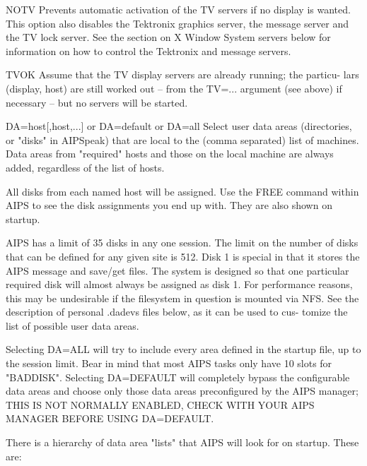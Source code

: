        NOTV    Prevents automatic activation of the  TV  servers  if  no  display  is
               wanted.   This option also disables the Tektronix graphics server, the
               message server and the TV lock server.  See the section  on  X  Window
               System  servers  below for information on how to control the Tektronix
               and message servers.

       TVOK    Assume that the TV display servers are already running;  the  particu-
               lars  (display, host) are still worked out -- from the TV=... argument
               (see above) if necessary -- but no servers will be started.

       DA=host[,host,...] or DA=default or DA=all
               Select user data areas (directories, or "disks" in AIPSpeak) that  are
               local  to  the  (comma  separated)  list of machines.  Data areas from
               "required" hosts and those on the  local  machine  are  always  added,
               regardless of the list of hosts.

               All disks from each named host will be assigned.  Use the FREE command
               within AIPS to see the disk assignments you end  up  with.   They  are
               also shown on startup.

               AIPS  has  a  limit  of 35 disks in any one session.  The limit on the
               number of disks that can be defined for any given site is 512.  Disk 1
               is special in that it stores the AIPS message and save/get files.  The
               system is designed so that one particular required  disk  will  almost
               always  be  assigned  as disk 1.  For performance reasons, this may be
               undesirable if the filesystem in question is mounted via NFS.  See the
               description of personal .dadevs files below, as it can be used to cus-
               tomize the list of possible user data areas.

               Selecting DA=ALL will try to include every area defined in the startup
               file, up to the session limit.  Bear in mind that most AIPS tasks only
               have 10 slots for  "BADDISK".   Selecting  DA=DEFAULT  will completely
               bypass the configurable data areas  and  choose only  those data areas
               preconfigured by the AIPS manager; THIS IS NOT NORMALLY ENABLED, CHECK
               WITH YOUR AIPS MANAGER BEFORE USING DA=DEFAULT.

               There  is  a hierarchy of data area "lists" that AIPS will look for on
               startup.  These are:

